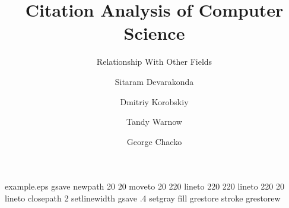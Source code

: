 %
%
%
%
%
\begin{filecontents*}{example.eps}
gsave
newpath
  20 20 moveto
  20 220 lineto
  220 220 lineto
  220 20 lineto
closepath
2 setlinewidth
gsave
  .4 setgray fill
grestore
stroke
grestorew
\end{filecontents*}
%
\RequirePackage{fix-cm}
%
\documentclass[smallextended]{svjour3}       %
%
\smartqed  %
%
\usepackage{graphicx}
\usepackage{xcolor}
\usepackage{listings}
%
%
%
%
%


\title{Citation Analysis of Computer Science%
}
\subtitle{Relationship With Other Fields}


\author{Sitaram Devarakonda  \and
	Dmitriy Korobskiy \and
        Tandy Warnow \and
        George Chacko }


